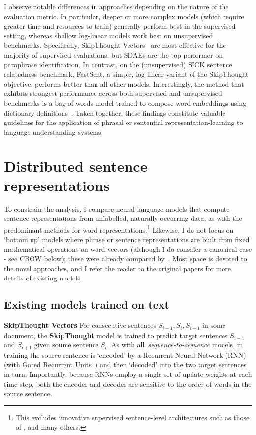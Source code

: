 I observe notable differences in approaches depending on the nature of the evaluation metric. In particular, deeper or more complex models (which require greater time and resources to train) generally perform best in the supervised setting, whereas shallow log-linear models work best on unsupervised benchmarks. Specifically, SkipThought Vectors~\citep{kiros2015skip} are most effective for the majority of supervised evaluations, but SDAEs are the top performer on paraphrase identification. In contrast, on the (unsupervised) SICK sentence relatedness benchmark, FastSent, a simple, log-linear variant of the SkipThought objective, performs better than all other models. Interestingly, the method that exhibits strongest performance across both supervised and unsupervised benchmarks is a bag-of-words model trained to compose word embeddings using dictionary definitions~\citep{hill2015learning}. Taken together, these findings constitute valuable guidelines for the application of phrasal or sentential representation-learning to language understanding systems.

\section{Distributed sentence representations}

To constrain the analysis, I compare neural language models that compute sentence representations from unlabelled, naturally-occurring data, as with the predominant methods for word representations.\footnote{This excludes innovative supervised sentence-level architectures such as those of \cite{socher2011semi},\cite{kalchbrenner2014convolutional} and many others.} Likewise, I do not focus on `bottom up' models where phrase or sentence representations are built from fixed mathematical operations on word vectors (although I do consider a canonical case - see CBOW below); these were already compared by~\cite{milajevs2014evaluating}. Most space is devoted to the novel approaches, and I refer the reader to the original papers for more details of existing models. 

\subsection{Existing models trained on text}
{\bf SkipThought Vectors} For consecutive sentences \(S_{i-1},S_i,S_{i+1}\) in some document, the {\bf SkipThought} model \citep{kiros2015skip} is trained to predict target sentences \(S_{i-1}\) and \(S_{i+1}\) given source sentence \(S_i\). As with all~\emph{sequence-to-sequence} models, in training the source sentence is `encoded' by a Recurrent Neural Network (RNN) (with Gated Recurrent Units~\citep{cho2014learning}) and then `decoded' into the two target sentences in turn. Importantly, because RNNs employ a single set of update weights at each time-step, both the encoder and decoder are sensitive to the order of words in the source sentence. 

